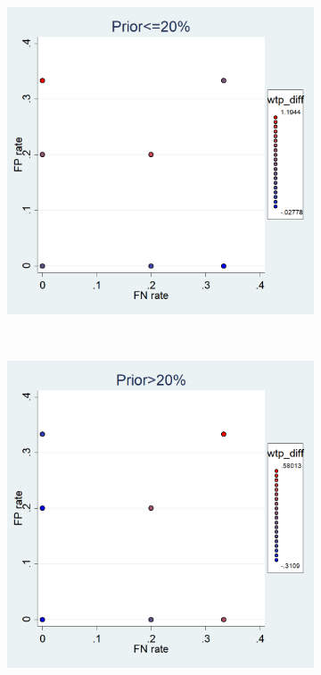 \documentclass[11pt,a4paper]{article}
\begin{document}
\begin{figure}[h]
\begin{subfigure}{0.5\textwidth}
\includegraphics[width=\textwidth]{Graphs/WTP_pattern_low.png}
\end{subfigure}
~
\begin{subfigure}{0.5\textwidth}
\includegraphics[width=\textwidth]{Graphs/WTP_pattern_high.png}
\end{subfigure}
\end{figure}
\end{document}
